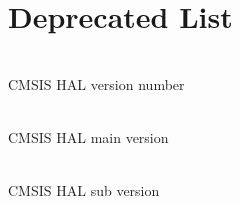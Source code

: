 \chapter{Deprecated List }
\hypertarget{deprecated}{}\label{deprecated}

\begin{DoxyRefList}
\item[{\parbox[t]{\linewidth}{Global \doxylink{core__cm4_8h_acb6f5d2c3271c95d0a02fd06723af25d}{\+\_\+\+\_\+\+CM4\+\_\+\+CMSIS\+\_\+\+VERSION} }}]\hfill \\
\label{deprecated__deprecated000003}%
%
CMSIS HAL version number  
\item[{\parbox[t]{\linewidth}{Global \doxylink{core__cm4_8h_a90ffc8179476f80347379bfe29639edc}{\+\_\+\+\_\+\+CM4\+\_\+\+CMSIS\+\_\+\+VERSION\+\_\+\+MAIN} }}]\hfill \\
\label{deprecated__deprecated000001}%
%
\+[31:\+16]\+ CMSIS HAL main version  
\item[{\parbox[t]{\linewidth}{Global \doxylink{core__cm4_8h_afc7392964da961a44e916fcff7add532}{\+\_\+\+\_\+\+CM4\+\_\+\+CMSIS\+\_\+\+VERSION\+\_\+\+SUB} }}]\hfill \\
\label{deprecated__deprecated000002}%
%
\+[15:\+0]\+ CMSIS HAL sub version 
\end{DoxyRefList}
